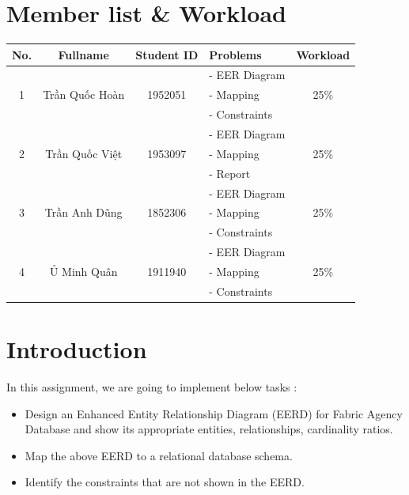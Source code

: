 \documentclass[a4paper]{article}
\begin{document}

\newpage
\tableofcontents
\newpage


\section{Member list \& Workload}

\begin{center}
\begin{tabular}{|c|c|c|l|c|}
\hline
\textbf{No.} & \textbf{Fullname} & \textbf{Student ID} & \textbf{Problems} & \textbf{Workload}\\
\hline 
\multirow{3}{*}{1} & \multirow{3}{*}{Trần Quốc Hoàn} & \multirow{3}{*}{1952051} & - EER Diagram & \multirow{3}{*}{25\%}\\
 & &  & - Mapping&\\
 & &  & - Constraints&\\
\hline 
\multirow{3}{*}{2} & \multirow{3}{*}{Trần Quốc Việt} & \multirow{3}{*}{1953097} & - EER Diagram & \multirow{3}{*}{25\%}\\
 & &  & - Mapping &\\
 & &  & - Report &\\
\hline
\multirow{3}{*}{3} & \multirow{3}{*}{Trần Anh Dũng} & \multirow{3}{*}{1852306} & - EER Diagram & \multirow{3}{*}{25\%}\\
 & &  & - Mapping &\\
 & &  & - Constraints&\\
\hline
\multirow{3}{*}{4} & \multirow{3}{*}{Ủ Minh Quân} & \multirow{3}{*}{1911940} & - EER Diagram & \multirow{3}{*}{25\%}\\
 & &  & - Mapping &\\
 & &  & - Constraints&\\
\hline


\end{tabular}
\end{center}

\section{Introduction}
In this assignment, we are going to implement below tasks : 
\begin{itemize}
    \item Design an Enhanced Entity Relationship Diagram (EERD) for Fabric Agency Database and show its appropriate entities, relationships, cardinality ratios.
    \item Map the above EERD to a relational database schema.
    \item Identify the constraints that are not shown in the EERD.
\end{itemize}
\end{document}
